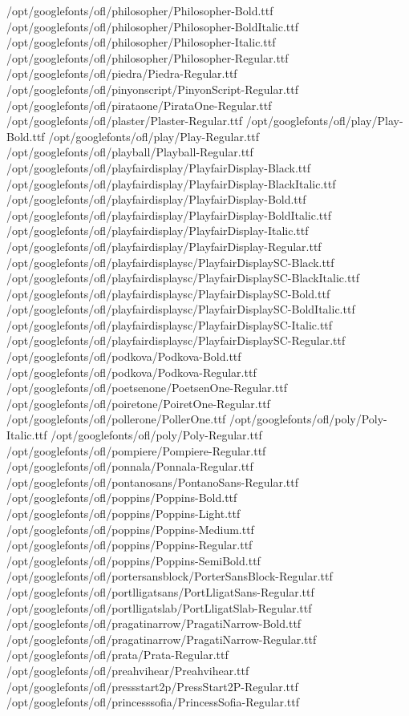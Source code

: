 /opt/googlefonts/ofl/philosopher/Philosopher-Bold.ttf
/opt/googlefonts/ofl/philosopher/Philosopher-BoldItalic.ttf
/opt/googlefonts/ofl/philosopher/Philosopher-Italic.ttf
/opt/googlefonts/ofl/philosopher/Philosopher-Regular.ttf
/opt/googlefonts/ofl/piedra/Piedra-Regular.ttf
/opt/googlefonts/ofl/pinyonscript/PinyonScript-Regular.ttf
/opt/googlefonts/ofl/pirataone/PirataOne-Regular.ttf
/opt/googlefonts/ofl/plaster/Plaster-Regular.ttf
/opt/googlefonts/ofl/play/Play-Bold.ttf
/opt/googlefonts/ofl/play/Play-Regular.ttf
/opt/googlefonts/ofl/playball/Playball-Regular.ttf
/opt/googlefonts/ofl/playfairdisplay/PlayfairDisplay-Black.ttf
/opt/googlefonts/ofl/playfairdisplay/PlayfairDisplay-BlackItalic.ttf
/opt/googlefonts/ofl/playfairdisplay/PlayfairDisplay-Bold.ttf
/opt/googlefonts/ofl/playfairdisplay/PlayfairDisplay-BoldItalic.ttf
/opt/googlefonts/ofl/playfairdisplay/PlayfairDisplay-Italic.ttf
/opt/googlefonts/ofl/playfairdisplay/PlayfairDisplay-Regular.ttf
/opt/googlefonts/ofl/playfairdisplaysc/PlayfairDisplaySC-Black.ttf
/opt/googlefonts/ofl/playfairdisplaysc/PlayfairDisplaySC-BlackItalic.ttf
/opt/googlefonts/ofl/playfairdisplaysc/PlayfairDisplaySC-Bold.ttf
/opt/googlefonts/ofl/playfairdisplaysc/PlayfairDisplaySC-BoldItalic.ttf
/opt/googlefonts/ofl/playfairdisplaysc/PlayfairDisplaySC-Italic.ttf
/opt/googlefonts/ofl/playfairdisplaysc/PlayfairDisplaySC-Regular.ttf
/opt/googlefonts/ofl/podkova/Podkova-Bold.ttf
/opt/googlefonts/ofl/podkova/Podkova-Regular.ttf
/opt/googlefonts/ofl/poetsenone/PoetsenOne-Regular.ttf
/opt/googlefonts/ofl/poiretone/PoiretOne-Regular.ttf
/opt/googlefonts/ofl/pollerone/PollerOne.ttf
/opt/googlefonts/ofl/poly/Poly-Italic.ttf
/opt/googlefonts/ofl/poly/Poly-Regular.ttf
/opt/googlefonts/ofl/pompiere/Pompiere-Regular.ttf
/opt/googlefonts/ofl/ponnala/Ponnala-Regular.ttf
/opt/googlefonts/ofl/pontanosans/PontanoSans-Regular.ttf
/opt/googlefonts/ofl/poppins/Poppins-Bold.ttf
/opt/googlefonts/ofl/poppins/Poppins-Light.ttf
/opt/googlefonts/ofl/poppins/Poppins-Medium.ttf
/opt/googlefonts/ofl/poppins/Poppins-Regular.ttf
/opt/googlefonts/ofl/poppins/Poppins-SemiBold.ttf
/opt/googlefonts/ofl/portersansblock/PorterSansBlock-Regular.ttf
/opt/googlefonts/ofl/portlligatsans/PortLligatSans-Regular.ttf
/opt/googlefonts/ofl/portlligatslab/PortLligatSlab-Regular.ttf
/opt/googlefonts/ofl/pragatinarrow/PragatiNarrow-Bold.ttf
/opt/googlefonts/ofl/pragatinarrow/PragatiNarrow-Regular.ttf
/opt/googlefonts/ofl/prata/Prata-Regular.ttf
/opt/googlefonts/ofl/preahvihear/Preahvihear.ttf
/opt/googlefonts/ofl/pressstart2p/PressStart2P-Regular.ttf
/opt/googlefonts/ofl/princesssofia/PrincessSofia-Regular.ttf
